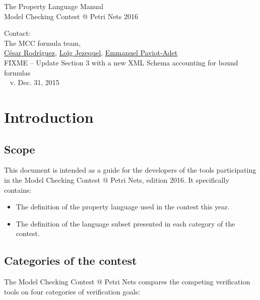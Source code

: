 \documentclass[10pt,english,a4paper]{article}
\makeatletter
\newcommand{\mcc}[0]{MCC}
\newcommand{\mccl}[0]{Model Checking Contest @ Petri Nets}
\makeatother
\begin{document}
\color{defaultcolor}

\vspace*{5cm}
\Huge
The Property Language Manual \\[10pt]
\Large
Model Checking Contest @ Petri Nets 2016

\vspace{3cm}
\large
Contact: \\[15pt]
The \mcc{} formula team, \\
\href{mailto:cesar.rodriguez@lipn.fr}{César Rodríguez},
\href{mailto:loig.jezequel@irccyn.ec-nantes.fr}{Loïg Jezequel},
\href{mailto:emmanuel.paviot-adet@lip6.fr}{Emmanuel Paviot-Adet}
\vspace{2cm}
\\
FIXME -- Update Section 3 with a new XML Schema accounting for bound formulas
\\

\vfill
~
\hfill
\scriptsize
v\@. Dec\@. 31, 2015
\normalsize

\clearpage
\tableofcontents

\clearpage
\section{Introduction}

\subsection{Scope}

This document is intended as a guide for the developers of
the tools participating in the \mccl{}, edition 2016.
It specifically contains:

\begin{itemize}
\item
  The definition of the property language used in the contest this year.
\item
  The definition of the language subset presented in each category of the
  contest.
\end{itemize}

\subsection{Categories of the contest}

The \mccl{} compares the competing verification tools on four
categories of verification goals:
\end{document}
